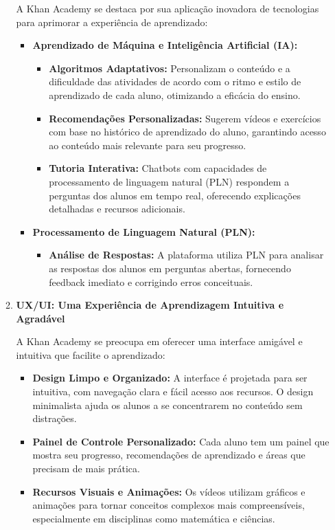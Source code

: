 \begin{itemize}
\begin{enumerate}
        A Khan Academy se destaca por sua aplicação inovadora de tecnologias para aprimorar a experiência de aprendizado:

        \begin{itemize}
            \item \textbf{Aprendizado de Máquina e Inteligência Artificial (IA):}
            \begin{itemize}
                \item \textbf{Algoritmos Adaptativos:} Personalizam o conteúdo e a dificuldade das atividades de acordo com o ritmo e estilo de aprendizado de cada aluno, otimizando a eficácia do ensino.
                \item \textbf{Recomendações Personalizadas:} Sugerem vídeos e exercícios com base no histórico de aprendizado do aluno, garantindo acesso ao conteúdo mais relevante para seu progresso.
                \item \textbf{Tutoria Interativa:} Chatbots com capacidades de processamento de linguagem natural (PLN) respondem a perguntas dos alunos em tempo real, oferecendo explicações detalhadas e recursos adicionais.
            \end{itemize}

            \item \textbf{Processamento de Linguagem Natural (PLN):}
            \begin{itemize}
                \item \textbf{Análise de Respostas:} A plataforma utiliza PLN para analisar as respostas dos alunos em perguntas abertas, fornecendo feedback imediato e corrigindo erros conceituais.
            \end{itemize}
        \end{itemize}

        \item \textbf{UX/UI: Uma Experiência de Aprendizagem Intuitiva e Agradável}
        
        A Khan Academy se preocupa em oferecer uma interface amigável e intuitiva que facilite o aprendizado:

        \begin{itemize}
            \item \textbf{Design Limpo e Organizado:} A interface é projetada para ser intuitiva, com navegação clara e fácil acesso aos recursos. O design minimalista ajuda os alunos a se concentrarem no conteúdo sem distrações.
            \item \textbf{Painel de Controle Personalizado:} Cada aluno tem um painel que mostra seu progresso, recomendações de aprendizado e áreas que precisam de mais prática.
            \item \textbf{Recursos Visuais e Animações:} Os vídeos utilizam gráficos e animações para tornar conceitos complexos mais compreensíveis, especialmente em disciplinas como matemática e ciências.
        \end{itemize}


\end{enumerate}
\end{itemize}
